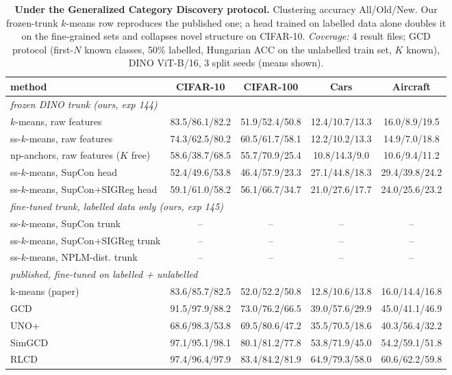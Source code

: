 \begin{landscape}
\begin{table}[p]
\centering
\footnotesize
\setlength{\tabcolsep}{3pt}
\begin{tabular}{lcccc}
\toprule
method & CIFAR-10 & CIFAR-100 & Cars & Aircraft \\
\midrule
\multicolumn{5}{l}{\emph{frozen DINO trunk (ours, exp 144)}} \\
\quad $k$-means, raw features & 83.5/86.1/82.2 & 51.9/52.4/50.8 & 12.4/10.7/13.3 & 16.0/8.9/19.5 \\
\quad ss-$k$-means, raw features & 74.3/62.5/80.2 & 60.5/61.7/58.1 & 12.2/10.2/13.3 & 14.9/7.0/18.8 \\
\quad np-anchors, raw features ($K$ free) & 58.6/38.7/68.5 & 55.7/70.9/25.4 & 10.8/14.3/9.0 & 10.6/9.4/11.2 \\
\quad ss-$k$-means, SupCon head & 52.4/49.6/53.8 & 46.4/57.9/23.3 & 27.1/44.8/18.3 & 29.4/39.8/24.2 \\
\quad ss-$k$-means, SupCon+SIGReg head & 59.1/61.0/58.2 & 56.1/66.7/34.7 & 21.0/27.6/17.7 & 24.0/25.6/23.2 \\
\multicolumn{5}{l}{\emph{fine-tuned trunk, labelled data only (ours, exp 145)}} \\
\quad ss-$k$-means, SupCon trunk & -- & -- & -- & -- \\
\quad ss-$k$-means, SupCon+SIGReg trunk & -- & -- & -- & -- \\
\quad ss-$k$-means, NPLM-dist. trunk & -- & -- & -- & -- \\
\multicolumn{5}{l}{\emph{published, fine-tuned on labelled + unlabelled}} \\
\quad k-means (paper) & 83.6/85.7/82.5 & 52.0/52.2/50.8 & 12.8/10.6/13.8 & 16.0/14.4/16.8 \\
\quad GCD & 91.5/97.9/88.2 & 73.0/76.2/66.5 & 39.0/57.6/29.9 & 45.0/41.1/46.9 \\
\quad UNO+ & 68.6/98.3/53.8 & 69.5/80.6/47.2 & 35.5/70.5/18.6 & 40.3/56.4/32.2 \\
\quad SimGCD & 97.1/95.1/98.1 & 80.1/81.2/77.8 & 53.8/71.9/45.0 & 54.2/59.1/51.8 \\
\quad RLCD & 97.4/96.4/97.9 & 83.4/84.2/81.9 & 64.9/79.3/58.0 & 60.6/62.2/59.8 \\
\bottomrule
\end{tabular}
\caption{\textbf{Under the Generalized Category Discovery protocol.} Clustering accuracy All/Old/New. Our frozen-trunk $k$-means row reproduces the published one; a head trained on labelled data alone doubles it on the fine-grained sets and collapses novel structure on CIFAR-10. \emph{Coverage:} 4 result files; GCD protocol (first-$N$ known classes, 50\% labelled, Hungarian ACC on the unlabelled train set, $K$ known), DINO ViT-B/16, 3 split seeds (means shown).}
\label{tab:gcd}
\end{table}
\end{landscape}
